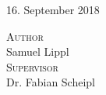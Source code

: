\begin{titlepage}

\vfill


{\Large 16. September 2018}\\[1cm]
\begin{Large}
\textsc{Author}\\Samuel Lippl\\[1cm]
\textsc{Supervisor}\\
Dr. Fabian Scheipl
\end{Large}

\vfill

\end{titlepage}